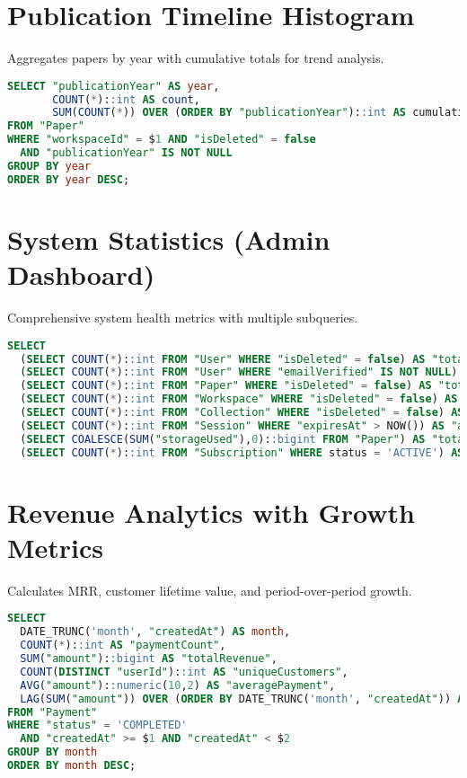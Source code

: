 \section{Publication Timeline Histogram}
Aggregates papers by year with cumulative totals for trend analysis.
\begin{lstlisting}[language=SQL]
SELECT "publicationYear" AS year,
       COUNT(*)::int AS count,
       SUM(COUNT(*)) OVER (ORDER BY "publicationYear")::int AS cumulative
FROM "Paper"
WHERE "workspaceId" = $1 AND "isDeleted" = false
  AND "publicationYear" IS NOT NULL
GROUP BY year
ORDER BY year DESC;
\end{lstlisting}

\section{System Statistics (Admin Dashboard)}
Comprehensive system health metrics with multiple subqueries.
\begin{lstlisting}[language=SQL]
SELECT
  (SELECT COUNT(*)::int FROM "User" WHERE "isDeleted" = false) AS "totalUsers",
  (SELECT COUNT(*)::int FROM "User" WHERE "emailVerified" IS NOT NULL) AS "verifiedUsers",
  (SELECT COUNT(*)::int FROM "Paper" WHERE "isDeleted" = false) AS "totalPapers",
  (SELECT COUNT(*)::int FROM "Workspace" WHERE "isDeleted" = false) AS "totalWorkspaces",
  (SELECT COUNT(*)::int FROM "Collection" WHERE "isDeleted" = false) AS "totalCollections",
  (SELECT COUNT(*)::int FROM "Session" WHERE "expiresAt" > NOW()) AS "activeSessions",
  (SELECT COALESCE(SUM("storageUsed"),0)::bigint FROM "Paper") AS "totalStorageUsed",
  (SELECT COUNT(*)::int FROM "Subscription" WHERE status = 'ACTIVE') AS "activeSubscriptions";
\end{lstlisting}

\section{Revenue Analytics with Growth Metrics}
Calculates MRR, customer lifetime value, and period-over-period growth.
\begin{lstlisting}[language=SQL]
SELECT
  DATE_TRUNC('month', "createdAt") AS month,
  COUNT(*)::int AS "paymentCount",
  SUM("amount")::bigint AS "totalRevenue",
  COUNT(DISTINCT "userId")::int AS "uniqueCustomers",
  AVG("amount")::numeric(10,2) AS "averagePayment",
  LAG(SUM("amount")) OVER (ORDER BY DATE_TRUNC('month', "createdAt")) AS "previousMonthRevenue"
FROM "Payment"
WHERE "status" = 'COMPLETED'
  AND "createdAt" >= $1 AND "createdAt" < $2
GROUP BY month
ORDER BY month DESC;
\end{lstlisting}

